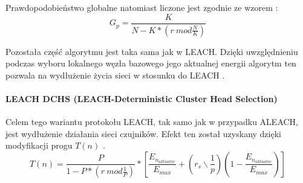 Prawdopodobieństwo globalne natomiast liczone jest zgodnie ze wzorem \cite{Ali2008}:
\[
	G_{p} = \frac{K}{N - K * (r \:mod \frac{N}{K})}
\]

Pozostała część algorytmu jest taka sama jak w LEACH. Dzięki uwzględnieniu podczas wyboru lokalnego węzła bazowego jego aktualnej energii algorytm ten pozwala na wydłużenie życia sieci w stosunku do LEACH \cite{Singh2017}.
\paragraph{LEACH DCHS (LEACH-Deterministic Cluster Head Selection)}
Celem tego wariantu protokołu LEACH, tak samo jak w przypadku ALEACH, jest wydłużenie działania sieci czujników. Efekt ten został uzyskany dzięki modyfikacji progu $T(n)$ \cite{Handy2002, Singh2017}.
 \[
	T(n) =  \frac{P}{1 - P * (r \:mod \frac{1}{P})} * \left[\frac{E_{n_{aktualne}}}{E_{max}} + \left(r_{s} \backslash \frac{1}{p}\right)\left(1 - \frac{E_{n_{aktualne}}}{E_{max}}\right)\right]
\]